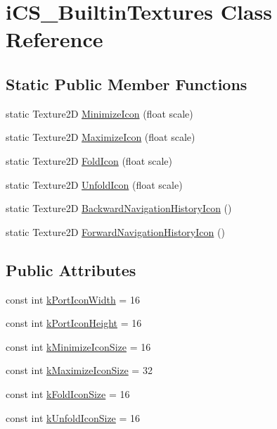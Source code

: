 \hypertarget{classi_c_s___builtin_textures}{\section{i\+C\+S\+\_\+\+Builtin\+Textures Class Reference}
\label{classi_c_s___builtin_textures}
}
\subsection*{Static Public Member Functions}
\begin{DoxyCompactItemize}
\item 
static Texture2\+D \hyperlink{classi_c_s___builtin_textures_aa04d174cc28c975f500c7de0dcaed27c}{Minimize\+Icon} (float scale)
\item 
static Texture2\+D \hyperlink{classi_c_s___builtin_textures_a171184fe7e4978e51421a3e831d70a99}{Maximize\+Icon} (float scale)
\item 
static Texture2\+D \hyperlink{classi_c_s___builtin_textures_ada9bb6451c8e3fcbefbedd10baf3d8a7}{Fold\+Icon} (float scale)
\item 
static Texture2\+D \hyperlink{classi_c_s___builtin_textures_a18563ff693a95adb2a58ec10067bde5d}{Unfold\+Icon} (float scale)
\item 
static Texture2\+D \hyperlink{classi_c_s___builtin_textures_a4594795bd6558dca0ce5ce8186d63d2c}{Backward\+Navigation\+History\+Icon} ()
\item 
static Texture2\+D \hyperlink{classi_c_s___builtin_textures_a22d01c6dabc5a120e477d6858ec02e60}{Forward\+Navigation\+History\+Icon} ()
\end{DoxyCompactItemize}
\subsection*{Public Attributes}
\begin{DoxyCompactItemize}
\item 
const int \hyperlink{classi_c_s___builtin_textures_a0aeb6dbe2682851d30b39e682f92b81b}{k\+Port\+Icon\+Width} = 16
\item 
const int \hyperlink{classi_c_s___builtin_textures_a667f3244020ef10d1d8f4a29de03f4ab}{k\+Port\+Icon\+Height} = 16
\item 
const int \hyperlink{classi_c_s___builtin_textures_a85cda91ec7fc096ff7d69fc48fddd735}{k\+Minimize\+Icon\+Size} = 16
\item 
const int \hyperlink{classi_c_s___builtin_textures_a254c76fabb1d139022cabaa2f2774222}{k\+Maximize\+Icon\+Size} = 32
\item 
const int \hyperlink{classi_c_s___builtin_textures_a445a71ba919f3089985d0e700bc58d14}{k\+Fold\+Icon\+Size} = 16
\item 
const int \hyperlink{classi_c_s___builtin_textures_a4c241ed093f39308fc1e58e9d23e51ee}{k\+Unfold\+Icon\+Size} = 16
\end{DoxyCompactItemize}
